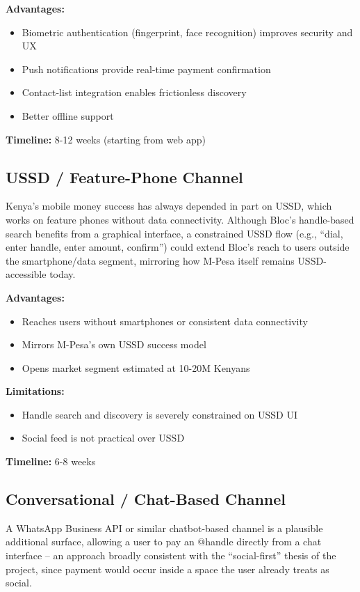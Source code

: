 \documentclass[12pt, a4paper, twoside, openright]{report}
\begin{document}
\textbf{Advantages:}
\begin{itemize}
    \item Biometric authentication (fingerprint, face recognition) improves security and UX
    \item Push notifications provide real-time payment confirmation
    \item Contact-list integration enables frictionless discovery
    \item Better offline support
\end{itemize}

\textbf{Timeline:} 8-12 weeks (starting from web app)

\subsection{USSD / Feature-Phone Channel}

Kenya's mobile money success has always depended in part on USSD, which works on feature phones without data connectivity. Although Bloc's handle-based search benefits from a graphical interface, a constrained USSD flow (e.g., ``dial, enter handle, enter amount, confirm'') could extend Bloc's reach to users outside the smartphone/data segment, mirroring how M-Pesa itself remains USSD-accessible today.

\textbf{Advantages:}
\begin{itemize}
    \item Reaches users without smartphones or consistent data connectivity
    \item Mirrors M-Pesa's own USSD success model
    \item Opens market segment estimated at 10-20M Kenyans
\end{itemize}

\textbf{Limitations:}
\begin{itemize}
    \item Handle search and discovery is severely constrained on USSD UI
    \item Social feed is not practical over USSD
\end{itemize}

\textbf{Timeline:} 6-8 weeks

\subsection{Conversational / Chat-Based Channel}

A WhatsApp Business API or similar chatbot-based channel is a plausible additional surface, allowing a user to pay an @handle directly from a chat interface -- an approach broadly consistent with the ``social-first'' thesis of the project, since payment would occur inside a space the user already treats as social.
\end{document}
